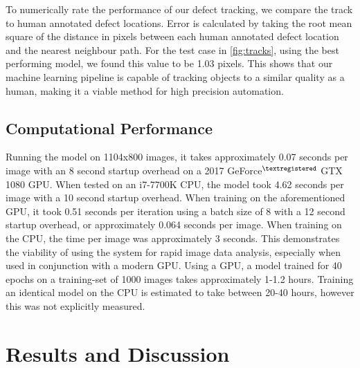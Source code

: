 \documentclass[prl,reprint,showpacs,floatfix,nofootinbib]{revtex4-1}
\begin{document}
To numerically rate the performance of our defect tracking, we compare the track to human annotated defect locations. Error is calculated by taking the root mean square of the distance in pixels between each human annotated defect location and the nearest neighbour path. For the test case in \ref{fig:tracks}, using the best performing model, we found this value to be 1.03 pixels. This shows that our machine learning pipeline is capable of tracking objects to a similar quality as a human, making it a viable method for high precision automation.

\subsection{Computational Performance}

Running the model on 1104x800 images, it takes approximately 0.07 seconds per image with an 8 second startup overhead on a 2017 GeForce$^{\tiny{\textregistered}}$ GTX 1080 GPU. When tested on an i7-7700K CPU, the model took 4.62 seconds per image with a 10 second startup overhead. When training on the aforementioned GPU, it took 0.51 seconds per iteration using a batch size of 8 with a 12 second startup overhead, or approximately 0.064 seconds per image. When training on the CPU, the time per image was approximately 3 seconds.   %
This demonstrates the viability of using the system for rapid image data analysis, especially when used in conjunction with a modern GPU. Using a GPU, a model trained for 40 epochs on a training-set of 1000 images takes approximately 1-1.2 hours.
Training an identical model on the CPU is estimated to take between 20-40 hours, however this was not explicitly measured.

\section{Results and Discussion}
\blindtext{}


\end{document}
